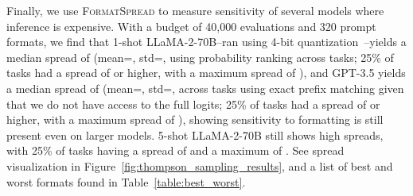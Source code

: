 \documentclass{article} %
\newcommand{\tbdone}[1]{}
\renewcommand{\tbdone}[1]{{\color{black}{#1}}}  %
\newcommand{\toolname}[1]{}
\renewcommand{\toolname}[1]{{\color{black} \textsc{FormatSpread}}}
\begin{document}
Finally, we use \toolname{} to measure sensitivity of several models where inference is expensive.
With a budget of 40,000 evaluations and 320 prompt formats, we find that 1-shot LLaMA-2-70B--ran using 4-bit quantization~\citep{dettmers2022gptint}--yields a median spread of \tbdone{0.171} (mean=\tbdone{0.221}, std=\tbdone{0.200}, using probability ranking across \tbdone{53} tasks; 25\% of tasks had a spread of \tbdone{0.292} or higher, with a maximum spread of \tbdone{0.876}), and GPT-3.5 yields a median spread of \tbdone{0.064} (mean=\tbdone{0.110}, std=\tbdone{0.115}, across \tbdone{53} tasks using exact prefix matching given that we do not have access to the full logits; 25\% of tasks had a spread of \tbdone{0.148} or higher, with a maximum spread of \tbdone{0.562}), showing sensitivity to formatting is still present even on larger models. 5-shot LLaMA-2-70B still shows high spreads, with 25\% of tasks having a spread of \tbdone{0.310} and a maximum of \tbdone{0.841}. See spread visualization in Figure~\ref{fig:thompson_sampling_results}, and a list of best and worst formats found in Table~\ref{table:best_worst}.

\end{document}
